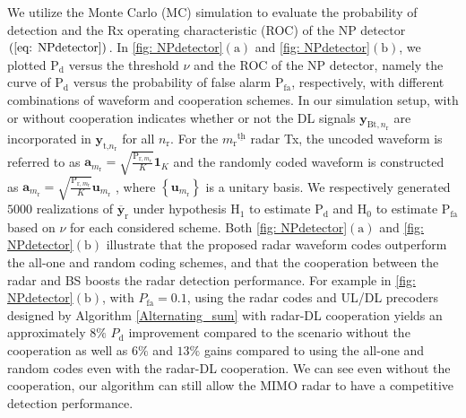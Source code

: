 \documentclass[9pt,journal]{IEEEtran}
\newcommand{\paren}[1]{\left({#1}\right)}
\newcommand{\braces}[1]{{\left\{ {#1}\right\}}}
\newcommand{\ith}[1]    {{#1}^{\underline{\text{th}}}}
\newcommand{\rr}{_\mathrm{r}}
\theoremstyle{definition}
\begin{document}
We utilize the Monte Carlo (MC) simulation to evaluate the probability of detection and the Rx operating characteristic (ROC) of the NP detector $\paren{\ref{eq: NPdetector}}$\cite{Kay1993detection}. In \figurename{\;\ref{fig: NPdetector}$\paren{\mathrm{a}}$} and \figurename{\;\ref{fig: NPdetector}$\paren{\mathrm{b}}$}, we plotted $\mathrm{P}_{\textrm{d}}$ versus the threshold $\nu$ and the ROC of the NP detector, namely the curve of $\mathrm{P}_{\textrm{d}}$ versus the probability of false alarm $\mathrm{P}_{\textrm{fa}}$, respectively, with different combinations of waveform and cooperation schemes. In our simulation setup, with or without cooperation indicates whether or not the DL signals $\mathbf{y}_{\textrm{Bt},n\rr}$ are incorporated in $\mathbf{y}_{\textrm{t,}n\rr}$ for all $n\rr$. For the $\ith{m\rr}$ radar Tx, the uncoded waveform is referred to as $\mathbf{a}_{m\rr}=\sqrt{\frac{\mathrm{P}_{\textrm{r},m\rr}}{\mathit{K}}}\mathbf{1}_{\mathit{K}}$ and the randomly coded waveform is constructed as $\mathbf{a}_{m\rr}=\sqrt{\frac{\mathrm{P}_{\textrm{r},m\rr}}{\mathit{K}}}\mathbf{u}_{m\rr}$ , where $\braces{\mathbf{u}_{m\rr}}$ is a unitary basis. We respectively generated $5000$ realizations of $\overline{\mathbf{y}}_{\textrm{r}}$ under hypothesis $\mathrm{H}_1$ to estimate $\mathrm{P}_{\textrm{d}}$ and $\mathrm{H}_0$ to estimate $\mathrm{P}_{\textrm{fa}}$ based on $\nu$ for each considered scheme. Both \figurename{\;\ref{fig: NPdetector}$\paren{\text{a}}$} and \figurename{\;\ref{fig: NPdetector}$\paren{\text{b}}$} illustrate that the proposed radar waveform codes outperform the all-one and random coding schemes, and that the cooperation between the radar and BS boosts the radar detection performance. For example in \figurename{\;\ref{fig: NPdetector}$\paren{\text{b}}$}, with $P_{\textrm{fa}}=0.1$, using the radar codes and UL/DL precoders designed by Algorithm \ref{Alternating_sum} with radar-DL cooperation yields an approximately $8\%$ $P_{\textrm{d}}$ improvement compared to the scenario without the cooperation as well as  $6\%$ and $13\%$ gains compared to using the all-one and random codes even with the radar-DL cooperation. We can see even without the cooperation, our algorithm can still allow the MIMO radar to have a competitive detection performance.

\vspace{-1em}
\end{document}

